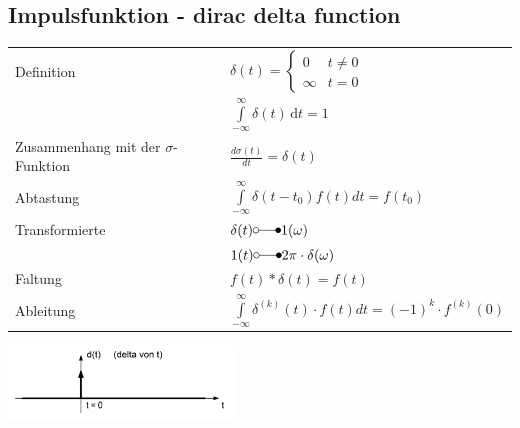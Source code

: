 \subsection{Impulsfunktion - dirac delta function}
	\begin{minipage}{10cm}
		\begin{tabular}{l l}
		Definition & $\delta (t)=\begin{cases} 0 & t\ne 0\\\infty & t=0\end{cases}$ \\
				   & $\int\limits_{-\infty}^\infty \delta(t) \, \mathrm dt = 1 $ \\
		Zusammenhang mit der $\sigma$-Funktion & $\frac{d\sigma(t)}{dt}=\delta(t)$ \\
		Abtastung & $\int\limits_{-\infty}^{\infty} \delta(t-t_0)f(t)dt=f(t_0)$ \\
		Transformierte & $\delta(t) \laplace 1(\omega)$ \\
						& $1(t) \laplace 2\pi \cdot \delta(\omega)$ \\
		Faltung & $f(t) \ast \delta(t) = f(t)$ \\
		Ableitung & $\int\limits_{-\infty}^{\infty} \delta^{(k)}(t) \cdot f(t) dt = (-1)^k \cdot f^{(k)}(0)$ \\
		\end{tabular}
	\end{minipage}
	\begin{minipage}{8cm}
		\includegraphics[width=6cm]{./bilder/diracimpulse.png}
	\end{minipage}
